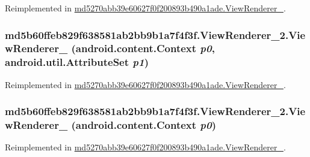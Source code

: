 Reimplemented in \hyperlink{classmd5270abb39e60627f0f200893b490a1ade_1_1_view_renderer__2_34f641fdb772410dc88ca2ac5c3fb492}{md5270abb39e60627f0f200893b490a1ade.ViewRenderer\_}.\hypertarget{classmd5b60ffeb829f638581ab2bb9b1a7f4f3f_1_1_view_renderer__2_c966f9a1a233932f6db02bda0d1474f0}{
\subsubsection[{ViewRenderer\_\-2}]{\setlength{\rightskip}{0pt plus 5cm}md5b60ffeb829f638581ab2bb9b1a7f4f3f.ViewRenderer\_\-2.ViewRenderer\_ (android.content.Context {\em p0}, \/  android.util.AttributeSet {\em p1})}}
\label{classmd5b60ffeb829f638581ab2bb9b1a7f4f3f_1_1_view_renderer__2_c966f9a1a233932f6db02bda0d1474f0}




Reimplemented in \hyperlink{classmd5270abb39e60627f0f200893b490a1ade_1_1_view_renderer__2_0295102267caddfc524759e82d0f5b04}{md5270abb39e60627f0f200893b490a1ade.ViewRenderer\_}.\hypertarget{classmd5b60ffeb829f638581ab2bb9b1a7f4f3f_1_1_view_renderer__2_afcf92f11bfe726fa3c914d9aa18b1a4}{
\subsubsection[{ViewRenderer\_\-2}]{\setlength{\rightskip}{0pt plus 5cm}md5b60ffeb829f638581ab2bb9b1a7f4f3f.ViewRenderer\_\-2.ViewRenderer\_ (android.content.Context {\em p0})}}
\label{classmd5b60ffeb829f638581ab2bb9b1a7f4f3f_1_1_view_renderer__2_afcf92f11bfe726fa3c914d9aa18b1a4}




Reimplemented in \hyperlink{classmd5270abb39e60627f0f200893b490a1ade_1_1_view_renderer__2_7f4b9d7dd89bbae2b8dd2f6c799e4c02}{md5270abb39e60627f0f200893b490a1ade.ViewRenderer\_}.

